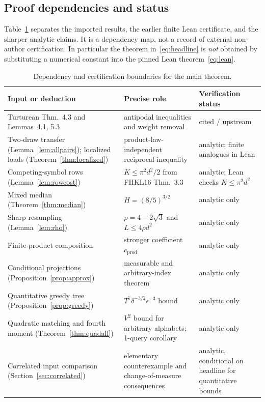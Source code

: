 \documentclass[11pt]{article}
\numberwithin{equation}{section}
\theoremstyle{remark}
\begin{document}
\subsection*{Proof dependencies and status}
Table~\ref{tab:dependencies} separates the imported results, the earlier finite
Lean certificate, and the sharper analytic claims. It is a dependency map,
not a record of external non-author certification. In particular the theorem
in~\eqref{eq:headline} is \emph{not} obtained by substituting a numerical
constant into the pinned Lean theorem~\eqref{eq:lean}.
\begin{table}[ht]
\centering\small
\begin{tabular}{@{}>{\raggedright\arraybackslash}p{.33\linewidth}>{\raggedright\arraybackslash}p{.34\linewidth}>{\raggedright\arraybackslash}p{.22\linewidth}@{}}\toprule
Input or deduction & Precise role & Verification status\\\midrule
Turturean Thm.~4.3 and Lemmas~4.1, 5.3 & antipodal inequalities and weight removal & cited / upstream\\
Two-draw transfer (Lemma~\ref{lem:allpairs}); localized loads (Theorem~\ref{thm:localized}) & product-law-independent reciprocal inequality & analytic; finite analogues in Lean\\
Competing-symbol rows (Lemma~\ref{lem:rowcost}) & $K\le\pi^2d^2/2$ from FHKL16 Thm.~3.3 & analytic; Lean checks $K\le\pi^2d^2$\\
Mixed median (Theorem~\ref{thm:median}) & $H=(8/5)^{3/2}$ & analytic only\\
Sharp resampling (Lemma~\ref{lem:rho}) & $\rho=4-2\sqrt3$ and $L\le4\rho d^2$ & analytic only\\
Finite-product composition & stronger coefficient $c_{\mathrm{prod}}$ & analytic only\\
Conditional projections (Proposition~\ref{prop:approx}) & measurable and arbitrary-index theorem & analytic only\\
Quantitative greedy tree (Proposition~\ref{prop:greedy}) & $T^7\delta^{-3/2}\epsilon^{-3}$ bound & analytic only\\
Quadratic matching and fourth moment (Theorem~\ref{thm:quadall}) & $V^2$ bound for arbitrary alphabets; 1-query corollary & analytic only\\
Correlated input comparison (Section~\ref{sec:correlated}) & elementary counterexample and change-of-measure consequences & analytic, conditional on headline for quantitative bounds\\\bottomrule
\end{tabular}
\caption{Dependency and certification boundaries for the main theorem.}\label{tab:dependencies}
\end{table}
\FloatBarrier
\end{document}
